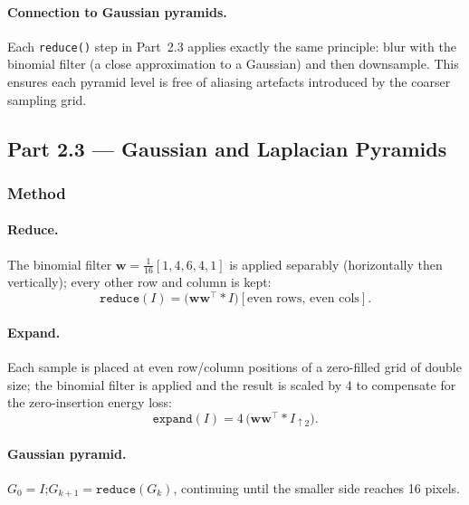\documentclass[12pt,a4paper]{article}
\begin{document}
\paragraph{Connection to Gaussian pyramids.}
Each \texttt{reduce()} step in Part~2.3 applies exactly the same principle:
blur with the binomial filter (a close approximation to a Gaussian) and then
downsample.  This ensures each pyramid level is free of aliasing artefacts
introduced by the coarser sampling grid.

\subsection{Part 2.3 \texorpdfstring{---}{-} Gaussian and Laplacian Pyramids}
\label{sec:23}

\subsubsection{Method}

\paragraph{Reduce.}
The binomial filter $\mathbf{w} = \tfrac{1}{16}[1,4,6,4,1]$ is applied
separably (horizontally then vertically); every other row and column is kept:
\begin{equation}
  \texttt{reduce}(I) = \bigl(\mathbf{w}\mathbf{w}^\top * I\bigr)[\text{even rows, even cols}].
  \label{eq:reduce}
\end{equation}

\paragraph{Expand.}
Each sample is placed at even row/column positions of a zero-filled grid of
double size; the binomial filter is applied and the result is scaled by 4 to
compensate for the zero-insertion energy loss:
\begin{equation}
  \texttt{expand}(I) = 4\,\bigl(\mathbf{w}\mathbf{w}^\top * I_{\uparrow 2}\bigr).
  \label{eq:expand}
\end{equation}

\paragraph{Gaussian pyramid.}
$G_0 = I$;\quad $G_{k+1} = \texttt{reduce}(G_k)$,
continuing until the smaller side reaches 16 pixels.
\end{document}
